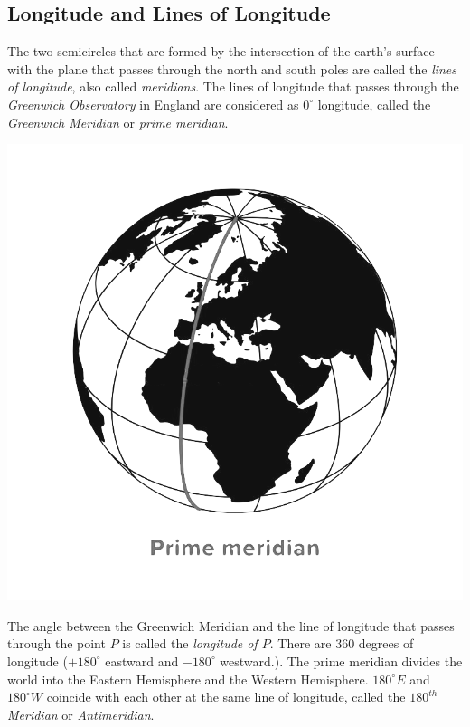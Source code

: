 \documentclass{report}
\begin{document}
\begin{multicols}{2}
    \subsection*{Longitude and Lines of Longitude}

    The two semicircles that are formed by the intersection of the earth's surface
    with the plane that passes through the north and south poles are called the
    \emph{lines of longitude}, also called \emph{meridians}. The lines of longitude
    that passes through the \emph{Greenwich Observatory} in England are considered
    as $0^{\circ}$ longitude, called the \emph{Greenwich Meridian} or \emph{prime
        meridian}.

    \begin{center}
        \includegraphics[scale=0.25]{primemeridian}
    \end{center}

    The angle between the Greenwich Meridian and the line of longitude that passes
    through the point $P$ is called the \emph{longitude of $P$}. There are 360
    degrees of longitude ($+180^\circ$ eastward and $-180^\circ$ westward.). The
    prime meridian divides the world into the Eastern Hemisphere and the Western
    Hemisphere. $180^{\circ}E$ and $180^{\circ}W$ coincide with each other at the
    same line of longitude, called the \emph{$180^{th}$ Meridian} or
    \emph{Antimeridian}.


\end{multicols}
\end{document}
